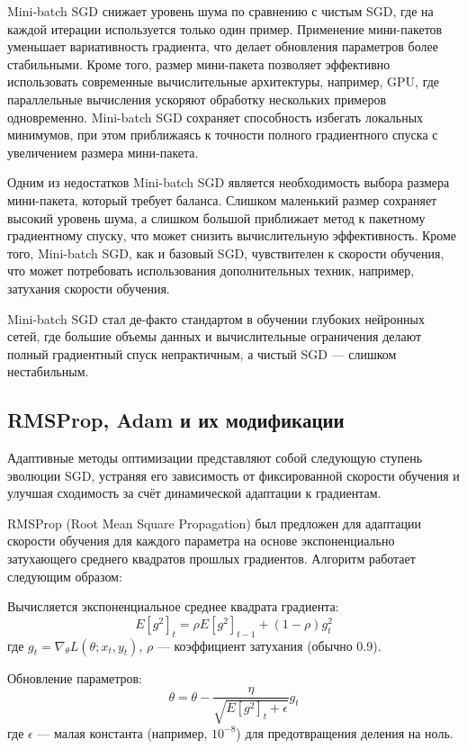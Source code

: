 \documentclass[11pt,a4paper]{article}
\begin{document}
Mini-batch SGD снижает уровень шума по сравнению с чистым SGD, где на каждой итерации используется только один пример. Применение мини-пакетов уменьшает вариативность градиента, что делает обновления параметров более стабильными. Кроме того, размер мини-пакета позволяет эффективно использовать современные вычислительные архитектуры, например, GPU, где параллельные вычисления ускоряют обработку нескольких примеров одновременно. Mini-batch SGD сохраняет способность избегать локальных минимумов, при этом приближаясь к точности полного градиентного спуска с увеличением размера мини-пакета.

Одним из недостатков Mini-batch SGD является необходимость выбора размера мини-пакета, который требует баланса. Слишком маленький размер сохраняет высокий уровень шума, а слишком большой приближает метод к пакетному градиентному спуску, что может снизить вычислительную эффективность. Кроме того, Mini-batch SGD, как и базовый SGD, чувствителен к скорости обучения, что может потребовать использования дополнительных техник, например, затухания скорости обучения.

Mini-batch SGD стал де-факто стандартом в обучении глубоких нейронных сетей, где большие объемы данных и вычислительные ограничения делают полный градиентный спуск непрактичным, а чистый SGD — слишком нестабильным.

\subsection{RMSProp, Adam и их модификации}

Адаптивные методы оптимизации представляют собой следующую ступень эволюции SGD, устраняя его зависимость от фиксированной скорости обучения и улучшая сходимость за счёт динамической адаптации к градиентам.

RMSProp (Root Mean Square Propagation) был предложен для адаптации скорости обучения для каждого параметра на основе экспоненциально затухающего среднего квадратов прошлых градиентов. Алгоритм работает следующим образом:

Вычисляется экспоненциальное среднее квадрата градиента:
\begin{equation}
E[g^2]_t = \rho E[g^2]_{t-1} + (1 - \rho) g_t^2
\end{equation}
где \( g_t = \nabla_\theta L(\theta; x_t, y_t) \), \( \rho \) — коэффициент затухания (обычно 0.9).

Обновление параметров:
\begin{equation}
\theta = \theta - \frac{\eta}{\sqrt{E[g^2]_t + \epsilon}} g_t
\end{equation}
где \( \epsilon \) — малая константа (например, \( 10^{-8} \)) для предотвращения деления на ноль.
\end{document}
